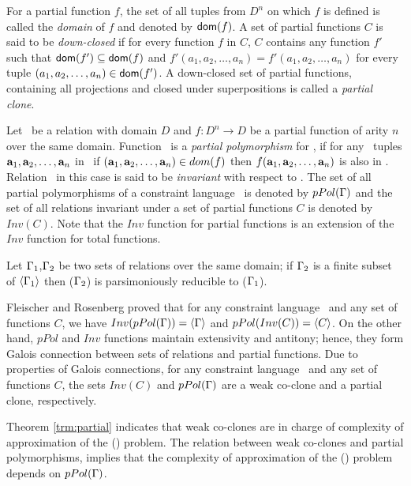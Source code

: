 For a partial function \(f\), the set of all tuples from \(D^n\) on which \(f\) is
defined is called the \emph{domain} of \(f\) and denoted by \({\sf dom}(f)\).
A set of partial functions \(C\) is said to be \emph{down-closed} if
for every function \(f\) in \(C\), \(C\) contains any function \(f'\) such that
\({\sf dom}(f')\subseteq{\sf dom}(f)\) and \(f'(a_1,a_2,\dotsc,a_n)=f'(a_1,a_2,\dotsc,a_n)\)
for every tuple \((a_1,a_2,\dotsc,a_n)\in {\sf dom}(f')\)\@.
A down-closed set of partial functions, 
containing all projections and closed under 
superpositions is called a \emph{partial clone}. 

Let \mR\ be a relation with domain \(D\) and \(f:D^n\to D\) be a partial function of arity \(n\)
over the same domain.
Function \mf\ is a \emph{partial polymorphism} for \mR,
if for any \mn\ tuples \(\textbf{a}_1,\textbf{a}_2,\dotsc,\textbf{a}_n\) in \mR\, 
if  \((\textbf{a}_1,\textbf{a}_2,\dotsc,\textbf{a}_n) \in dom(f)\) then 
\(f(\textbf{a}_1,\textbf{a}_2,\dotsc,\textbf{a}_n)\) is also in \mR\@. Relation \mR\ in this case is said to
be \emph{invariant} with respect to \mf\@.
The set of all partial polymorphisms of a constraint language \mrelset\ is denoted by
\(pPol(\Gamma)\) and the set of all relations invariant under a set of partial functions
\(C\) is denoted by \(Inv(C)\)\@. Note that the \(Inv\) function for partial functions is
an extension of the \(Inv\) function for total functions.

\begin{theorem}  \label{trm:partial}
Let \(\Gamma_1\),\(\Gamma_2\) be two sets of relations over the same domain; if 
\(\Gamma_2\) is a finite subset of \(\langle \Gamma_1 \rangle\) then
\ccsp(\(\Gamma_2\)) is parsimoniously reducible to \ccsp(\(\Gamma_1\))\@.
\end{theorem}

Fleischer and Rosenberg \cite{Rosenberg} proved that for any constraint language \mrelset\
and any set of functions \(C\),
we have \(Inv(pPol(\Gamma))=\langle \Gamma \rangle\) and
\(pPol(Inv(C))=\langle C \rangle\)\@. On the other hand, \(pPol\) and \(Inv\) functions 
maintain extensivity and antitony; hence, they form Galois connection between 
sets of relations and partial functions. Due to properties of Galois connections,
for any constraint language \mrelset\ and any set of functions \(C\), the 
sets \(Inv(C)\) and \(pPol(\Gamma)\) are a weak co-clone and a partial clone, respectively.

Theorem \ref{trm:partial} indicates that weak co-clones are
in charge of complexity of approximation of the \ccsp(\mrelset) problem.
The relation between weak co-clones and partial polymorphisms,
implies that the complexity of approximation of the \ccsp(\mrelset) problem 
depends on \(pPol(\Gamma)\)\@.

